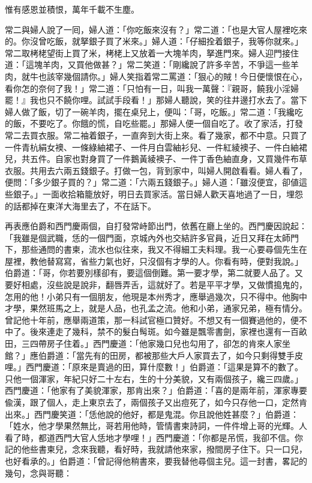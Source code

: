 \begin{myquote}
惟有感恩並積恨，萬年千載不生塵。
\end{myquote}

常二與婦人說了一囘，婦人道：「你吃飯來沒有？」常二道：「也是大官人屋裡吃來的。你沒曾吃飯，就拏銀子買了米來。」婦人道：「仔細拴着銀子，我等你就來。」{}常二取栲栳望街上買了米，栲栳上又放着一大塊羊肉，拏進門來。婦人迎門接住道：「這塊羊肉，又買他做甚？」常二笑道：「剛纔說了許多辛苦，不爭這一些羊肉，就牛也該宰幾個請你。」婦人笑指着常二罵道：「狠心的賊！今日便懷恨在心，看你怎的奈何了我！」常二道：「只怕有一日，叫我一萬聲：『親哥，饒我小淫婦罷！』我也只不饒你哩。試試手段看！」{}那婦人聽說，笑的往井邊打水去了。當下婦人做了飯，切了一碗羊肉，擺在桌兒上，便叫：「哥，吃飯。」常二道：「我纔吃的飯，不要吃了。你餓的慌，自吃些罷。」那婦人便一個自吃了。收了家活，打發常二去買衣服。常二袖着銀子，一直奔到大街上來。看了幾家，都不中意。只買了一件青杭絹女襖、一條綠紬裙子、一件月白雲紬衫兒、一件紅綾襖子、一件白紬裙兒，共五件。自家也對身買了一件鵝黃綾襖子、一件丁香色紬直身，又買幾件布草衣服。共用去六兩五錢銀子。打做一包，背到家中，叫婦人開啟看看。婦人看了，便問：「多少銀子買的？」常二道：「六兩五錢銀子。」婦人道：「雖沒便宜，卻値這些銀子。」一面收拾箱籠放好，明日去買家活。當日婦人歡天喜地過了一日，埋怨的話都掉在東洋大海里去了，不在話下。

再表應伯爵和西門慶兩個，自打發常峙節出門，依舊在廳上坐的。西門慶因說起：「我雖是個武職，恁的一個門面，京城內外也交結許多官員，近日又拜在太師門下，那些通問的書柬，流水也似往來，我又不得細工夫料理。我一心要尋個先生在屋裡，教他替寫寫，省些力氣也好，只沒個有才學的人。你看有時，便對我說。」伯爵道：「哥，你若要別樣卻有，要這個倒難。第一要才學，第二就要人品了。又要好相處，沒些說是說非，翻唇弄舌，這就好了。若是平平才學，又做慣搗鬼的，怎用的他！小弟只有一個朋友，他現是本州秀才，應舉過幾次，只不得中。他胸中才學，果然班馬之上，就是人品，也孔孟之流。他和小弟，通家兄弟，極有情分。曾記他十年前，應舉兩道策，那一科試官極口贊好。不想又有一個賽過他的，便不中了。後來連走了幾科，禁不的髮白髩斑。如今雖是飄零書劍，家裡也還有一百畝田，三四帶房子住着。」西門慶道：「他家幾口兒也勾用了，卻怎的肯來人家坐館？」應伯爵道：「當先有的田房，都被那些大戶人家買去了，如今只剩得雙手皮哩。」{}西門慶道：「原來是賣過的田，算什麼數！」伯爵道：「這果是算不的數了。只他一個渾家，年紀只好二十左右，生的十分美貌，又有兩個孩子，纔三四歲。」西門慶道：「他家有了美貌渾家，那肯出來？」伯爵道：「喜的是兩年前，渾家專要偸漢，跟了個人，走上東京去了，兩個孩子又出痘死了，如今只存他一口，定然肯出來。」西門慶笑道：「恁他說的他好，都是鬼混。你且說他姓甚麼？」伯爵道：「姓水，他才學果然無比，哥若用他時，管情書柬詩詞，一件件增上哥的光輝。人看了時，都道西門大官人恁地才學哩！」西門慶道：「你都是吊慌，我卻不信。你記的他些書柬兒，念來我聽，看好時，我就請他來家，撥間房子住下。只一口兒，也好看承的。」伯爵道：「曾記得他稍書來，要我替他尋個主兒。這一封書，畧記的幾句，念與哥聽：

